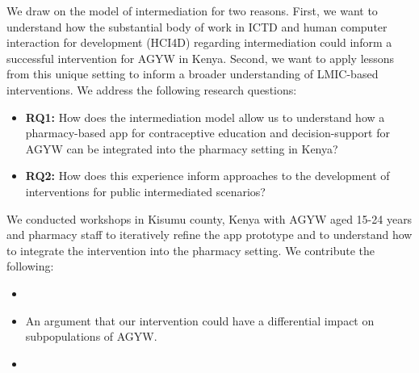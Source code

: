 We draw on the model of intermediation for two reasons. First, we want to understand how the substantial body of work in ICTD and human computer interaction for development (HCI4D) regarding intermediation could inform a successful intervention for AGYW in Kenya. Second, we want to apply lessons from this unique setting to inform a broader understanding of LMIC-based interventions. We address the following research questions:
\begin{itemize}
\item \textbf{RQ1:} How does the intermediation model allow us to understand how a pharmacy-based app for contraceptive education and decision-support for AGYW can be integrated into the pharmacy setting in Kenya?
\item \textbf{RQ2:} How does this experience inform approaches to the development of interventions for public intermediated scenarios?
\end{itemize}

We conducted workshops in Kisumu county, Kenya with AGYW aged 15-24 years and pharmacy staff to iteratively refine the app prototype and to understand how to integrate the intervention into the pharmacy setting.  We contribute the following:

\begin{itemize}
\item {}
\item An argument that our intervention could have a differential impact on subpopulations of AGYW. 
\item {} 
\end{itemize}

